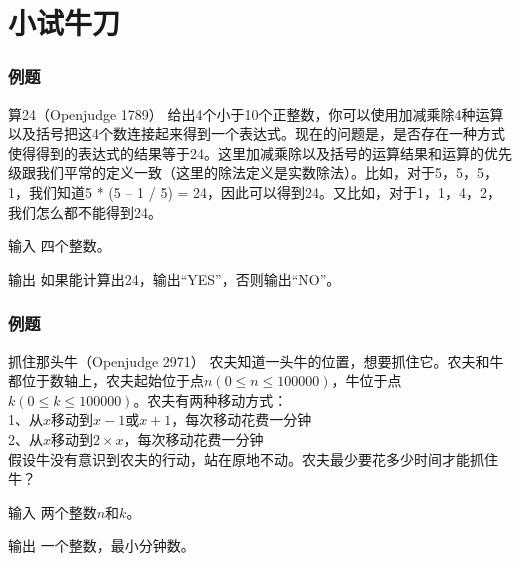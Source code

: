 \documentclass[11pt]{beamer}
\begin{document}
  \section{小试牛刀}
  \begin{frame}[c]
  	\frametitle{例题}
  	\begin{block}{算24（Openjudge 1789）}
  		给出4个小于10个正整数，你可以使用加减乘除4种运算以及括号把这4个数连接起来得到一个表达式。现在的问题是，是否存在一种方式使得得到的表达式的结果等于24。这里加减乘除以及括号的运算结果和运算的优先级跟我们平常的定义一致（这里的除法定义是实数除法）。比如，对于5，5，5，1，我们知道5 * (5 – 1 / 5) = 24，因此可以得到24。又比如，对于1，1，4，2，我们怎么都不能得到24。
  	\end{block}
  	\begin{block}{输入}
  		四个整数。
  	\end{block}
  	\begin{block}{输出}
  	  如果能计算出24，输出``YES''，否则输出``NO''。
  	\end{block}
  \end{frame}
  \begin{frame}[c]
  	\frametitle{例题}
  	\begin{block}{抓住那头牛（Openjudge 2971）}
  		农夫知道一头牛的位置，想要抓住它。农夫和牛都位于数轴上，农夫起始位于点$n(0 \leq n \leq 100000)$，牛位于点$k(0 \leq k \leq 100000)$。农夫有两种移动方式：\\
			1、从$x$移动到$x-1$或$x+1$，每次移动花费一分钟 \\
			2、从$x$移动到$2\times x$，每次移动花费一分钟 \\
			假设牛没有意识到农夫的行动，站在原地不动。农夫最少要花多少时间才能抓住牛？
  	\end{block}
  	\begin{block}{输入}
  		两个整数$n$和$k$。
  	\end{block}
  	\begin{block}{输出}
  	  一个整数，最小分钟数。
  	\end{block}
  \end{frame}
\end{document}
